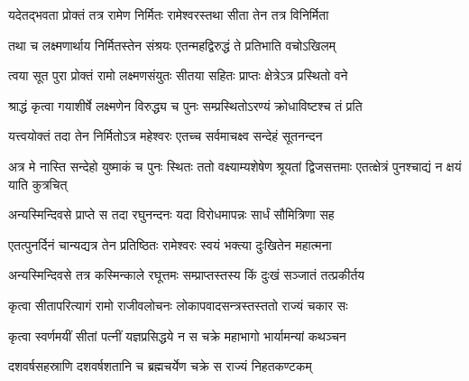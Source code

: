 
\vakta{}
\shrota{}
\tags{}
\notes{}

\storymeta


\resetShloka


\twolineshloka
{यदेतद्भवता प्रोक्तं तत्र रामेण निर्मितः}
{रामेश्वरस्तथा सीता तेन तत्र विनिर्मिता}%

\twolineshloka
{तथा च लक्ष्मणार्थाय निर्मितस्तेन संश्रयः}
{एतन्महद्विरुद्धं ते प्रतिभाति वचोऽखिलम्}%

\twolineshloka
{त्वया सूत पुरा प्रोक्तं रामो लक्ष्मणसंयुतः}
{सीतया सहितः प्राप्तः क्षेत्रेऽत्र प्रस्थितो वने}%

\twolineshloka
{श्राद्धं कृत्वा गयाशीर्षे लक्ष्मणेन विरुद्ध्य च}
{पुनः सम्प्रस्थितोऽरण्यं क्रोधाविष्टश्च तं प्रति}%

\twolineshloka
{यत्त्वयोक्तं तदा तेन निर्मितोऽत्र महेश्वरः}
{एतच्च सर्वमाचक्ष्व सन्देहं सूतनन्दन}%



\threelineshloka
{अत्र मे नास्ति सन्देहो युष्माकं च पुनः स्थितः}
{ततो वक्ष्याम्यशेषेण श्रूयतां द्विजसत्तमाः}
{एतत्क्षेत्रं पुनश्चाद्यं न क्षयं याति कुत्रचित्}%

\twolineshloka
{अन्यस्मिन्दिवसे प्राप्ते स तदा रघुनन्दनः}
{यदा विरोधमापन्नः सार्धं सौमित्रिणा सह}%

\twolineshloka
{एतत्पुनर्दिनं चान्यद्यत्र तेन प्रतिष्ठितः}
{रामेश्वरः स्वयं भक्त्या दुःखितेन महात्मना}%


\twolineshloka
{अन्यस्मिन्दिवसे तत्र कस्मिन्काले रघूत्तमः}
{सम्प्राप्तस्तस्य किं दुःखं सञ्जातं तत्प्रकीर्तय}%


\twolineshloka
{कृत्वा सीतापरित्यागं रामो राजीवलोचनः}
{लोकापवादसन्त्रस्तस्ततो राज्यं चकार सः}%

\twolineshloka
{कृत्वा स्वर्णमयीं सीतां पत्नीं यज्ञप्रसिद्धये}
{न स चक्रे महाभागो भार्यामन्यां कथञ्चन}%

\twolineshloka
{दशवर्षसहस्राणि दशवर्षशतानि च}
{ब्रह्मचर्येण चक्रे स राज्यं निहतकण्टकम्}%

